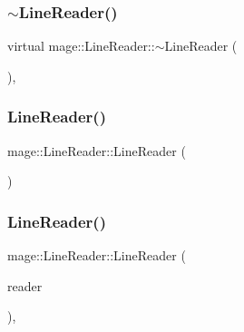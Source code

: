 \subsubsection{\texorpdfstring{$\sim$\+Line\+Reader()}{~LineReader()}}
{\footnotesize\ttfamily virtual mage\+::\+Line\+Reader\+::$\sim$\+Line\+Reader (\begin{DoxyParamCaption}{ }\end{DoxyParamCaption})\hspace{0.3cm}{\ttfamily [virtual]}, {\ttfamily [default]}}

\hypertarget{classmage_1_1_line_reader_ab4a46321d7ea3ecda2d6390c78a7285b}{}\label{classmage_1_1_line_reader_ab4a46321d7ea3ecda2d6390c78a7285b} 
\subsubsection{\texorpdfstring{Line\+Reader()}{LineReader()}\hspace{0.1cm}{\footnotesize\ttfamily [1/3]}}
{\footnotesize\ttfamily mage\+::\+Line\+Reader\+::\+Line\+Reader (\begin{DoxyParamCaption}{ }\end{DoxyParamCaption})\hspace{0.3cm}{\ttfamily [protected]}}

\hypertarget{classmage_1_1_line_reader_ae4f871bebae110704b34c0bd88460639}{}\label{classmage_1_1_line_reader_ae4f871bebae110704b34c0bd88460639} 
\subsubsection{\texorpdfstring{Line\+Reader()}{LineReader()}\hspace{0.1cm}{\footnotesize\ttfamily [2/3]}}
{\footnotesize\ttfamily mage\+::\+Line\+Reader\+::\+Line\+Reader (\begin{DoxyParamCaption}\item[{const \hyperlink{classmage_1_1_line_reader}{Line\+Reader} \&}]{reader }\end{DoxyParamCaption})\hspace{0.3cm}{\ttfamily [private]}, {\ttfamily [delete]}}

\hypertarget{classmage_1_1_line_reader_a6447cc854280ade147c6e03e53c15fb1}{}\label{classmage_1_1_line_reader_a6447cc854280ade147c6e03e53c15fb1} 
